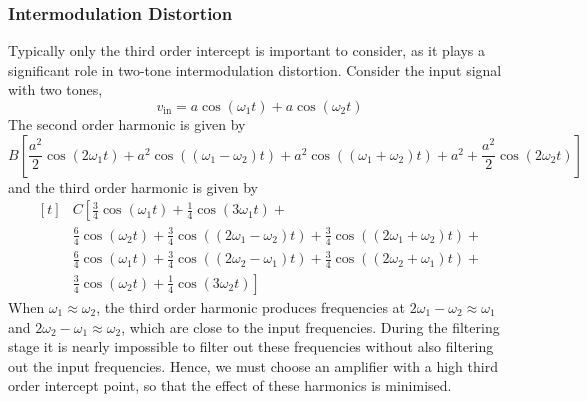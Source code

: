 \documentclass{article}
\begin{document}
\subsubsection{Intermodulation Distortion}
Typically only the third order intercept is important to consider, as
it plays a significant role in two-tone intermodulation distortion.
Consider the input signal with two tones,
\begin{equation*}
    v_{\mathrm{in}} = a \cos{\left( \omega_1 t \right)} + a \cos{\left( \omega_2 t \right)}
\end{equation*}
The second order harmonic is given by
\begin{equation*}
    B \left[ \frac{a^2}{2} \cos{\left( 2\omega_1 t \right)} + a^2 \cos{\left( \left( \omega_1 - \omega_2 \right) t \right)} + a^2 \cos{\left( \left( \omega_1 + \omega_2 \right) t \right)} + a^2 + \frac{a^2}{2} \cos{\left( 2\omega_2 t \right)} \right]
\end{equation*}
and the third order harmonic is given by
\begin{equation*}
    \begin{aligned}[t]
         & C \left[ \frac{3}{4} \cos{\left( \omega_1 t \right)} + \frac{1}{4} \cos{\left( 3\omega_1 t \right)} \right. +                                                                                      \\
         & \frac{6}{4} \cos{\left( \omega_2 t \right)} + \frac{3}{4} \cos{\left( \left( 2\omega_1 - \omega_2 \right) t \right)} + \frac{3}{4} \cos{\left( \left( 2\omega_1 + \omega_2 \right) t \right)} + {} \\
         & \frac{6}{4} \cos{\left( \omega_1 t \right)} + \frac{3}{4} \cos{\left( \left( 2\omega_2 - \omega_1 \right) t \right)} + \frac{3}{4} \cos{\left( \left( 2\omega_2 + \omega_1 \right) t \right)} + {} \\
         & \left. \frac{3}{4} \cos{\left( \omega_2 t \right)} + \frac{1}{4} \cos{\left( 3\omega_2 t \right)} \right]
    \end{aligned}
\end{equation*}
When \(\omega_1 \approx \omega_2\), the third order harmonic produces
frequencies at \(2 \omega_1 - \omega_2 \approx \omega_1\) and
\(2 \omega_2 - \omega_1 \approx \omega_2\), which are close to the
input frequencies. During the filtering stage it is nearly impossible
to filter out these frequencies without also filtering out the input
frequencies. Hence, we must choose an amplifier with a high third order
intercept point, so that the effect of these harmonics is minimised.
\end{document}
